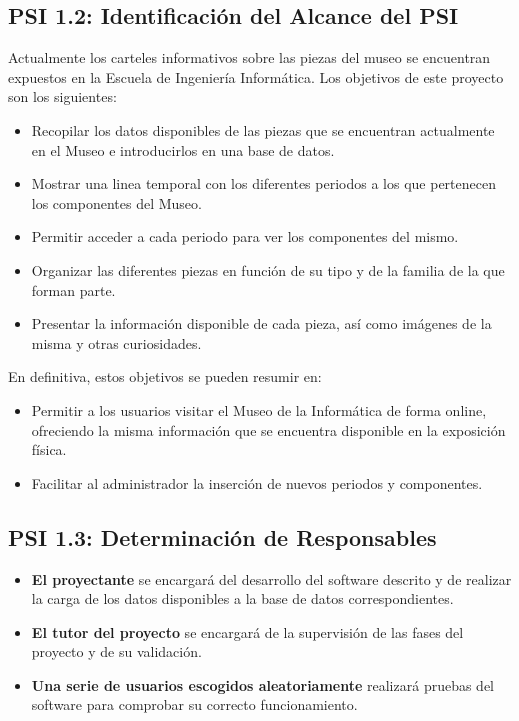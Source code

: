 \subsection{PSI 1.2: Identificación del Alcance del PSI}
Actualmente los carteles informativos sobre las piezas del museo se encuentran expuestos en la Escuela de Ingeniería Informática. Los objetivos de este proyecto son los siguientes:
\begin{itemize}
	\item Recopilar los datos disponibles de las piezas que se encuentran actualmente en el Museo e introducirlos en una base de datos.	
	\item Mostrar una linea temporal con los diferentes periodos a los que pertenecen los componentes del Museo. 
	\item Permitir acceder a cada periodo para ver los componentes del mismo.
	\item Organizar las diferentes piezas en función de su tipo y de la familia de la que forman parte.
	\item Presentar la información disponible de cada pieza, así como imágenes de la misma y otras curiosidades.
\end{itemize}
En definitiva, estos objetivos se pueden resumir en:
\begin{itemize}
	\item Permitir a los usuarios visitar el Museo de la Informática de forma online, ofreciendo la misma información que se encuentra disponible en la exposición física.
	\item Facilitar al administrador la inserción de nuevos periodos y componentes.
\end{itemize}

\subsection{PSI 1.3: Determinación de Responsables}
\begin{itemize}
	\item \textbf{El proyectante} se encargará del desarrollo del software descrito y de realizar la carga de los datos disponibles a la base de datos correspondientes.
	\item\textbf{El tutor del proyecto} se encargará de la supervisión de las fases del proyecto y de su validación.
	\item \textbf{Una serie de usuarios escogidos aleatoriamente} realizará pruebas del software para comprobar su correcto funcionamiento.
\end{itemize}


